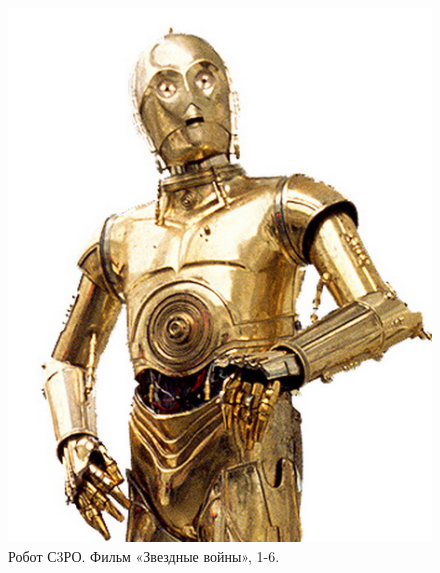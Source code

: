 \begin{figure}[h!]
	\begin{center}
		\includegraphics[width=1\linewidth]{chapters/chapter1/images/7}
		\caption{Робот С3РО. Фильм «Звездные войны», 1-6.}
		\label{ris:image1x7}
	\end{center}
\end{figure}
